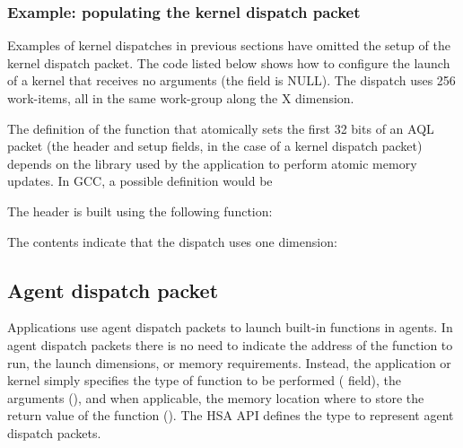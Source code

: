 \documentclass[oneside]{book}
\begin{document}
\subsubsection{Example: populating the kernel dispatch packet}
Examples of kernel dispatches in previous sections have omitted the setup of the
kernel dispatch packet. The code listed below shows how to configure the launch
of a kernel that receives no arguments (the
 field is NULL). The
dispatch uses 256 work-items, all in the same work-group along the X dimension.


The definition of the function that atomically sets the first 32 bits of an AQL
packet (the header and setup fields, in the case of a kernel dispatch packet)
depends on the library used by the application to perform atomic memory
updates. In GCC, a possible definition would be


The header is built using the following function:


The  contents indicate that the
dispatch uses one dimension:


\subsection{Agent dispatch packet}\label{agent-packet}

Applications use agent dispatch packets to launch built-in functions in
agents. In agent dispatch packets there is no need to indicate the address of
the function to run, the launch dimensions, or memory requirements. Instead, the
application or kernel simply specifies the type of function to be performed
( field), the arguments
(), and when applicable, the memory
location where to store the return value of the function
(). The HSA API defines the
type  to represent agent dispatch packets.
\end{document}
